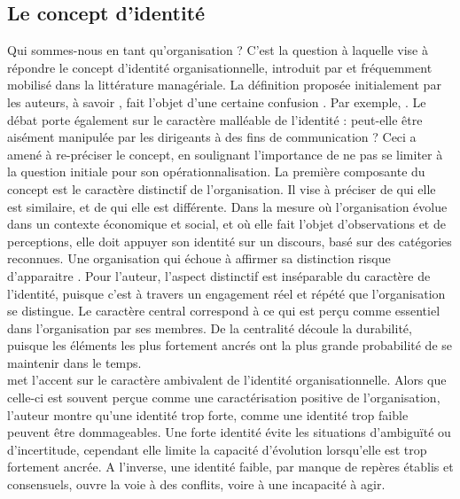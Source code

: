     \subsection{Le concept d'identité}
        Qui sommes-nous en tant qu'organisation ? C'est la question à laquelle vise à répondre le concept d'identité organisationnelle, introduit par \textcite{albert1985organizational} et fréquemment mobilisé dans la littérature managériale. La définition proposée initialement par les auteurs, à savoir , fait l'objet d'une certaine confusion \parencite{chedotel2004ambivalence}. Par exemple,  \parencite{whetten2006albert}. Le débat porte également sur le caractère malléable de l'identité : peut-elle être aisément manipulée par les dirigeants à des fins de communication ? Ceci a amené \textcite{whetten2006albert} à re-préciser le concept, en soulignant l'importance de ne pas se limiter à la question initiale pour son opérationnalisation. La première composante du concept est le caractère distinctif de l'organisation. Il vise à préciser de qui elle est similaire, et de qui elle est différente. Dans la mesure où l'organisation évolue dans un contexte économique et social, et où elle fait l'objet d'observations et de perceptions, elle doit appuyer son identité sur un discours, basé sur des catégories reconnues. Une organisation qui échoue à affirmer sa distinction risque d'apparaitre  \parencite{whetten2006albert}. Pour l'auteur, l'aspect distinctif est inséparable du caractère  de l'identité, puisque c'est à travers un engagement réel et répété que l'organisation se distingue. Le caractère central correspond à ce qui est perçu comme essentiel dans l'organisation par ses membres. De la centralité découle la durabilité, puisque les éléments les plus fortement ancrés ont la plus grande probabilité de se maintenir dans le temps. \\


       \textcite{chedotel2004ambivalence} met l'accent sur le caractère ambivalent de l'identité organisationnelle. Alors que celle-ci est souvent perçue comme une caractérisation positive de l'organisation, l'auteur montre qu'une identité trop forte, comme une identité trop faible peuvent être dommageables. Une forte identité évite les situations d'ambiguïté ou d'incertitude, cependant elle limite la capacité d'évolution lorsqu'elle est trop fortement ancrée. A l'inverse, une identité faible, par manque de repères établis et consensuels, ouvre la voie à des conflits, voire à une incapacité à agir. \\

